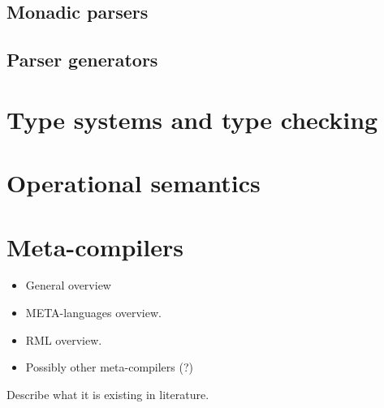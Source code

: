 \subsection{Monadic parsers}

\subsection{Parser generators}

\section{Type systems and type checking}
\label{sec:ch_background_type_checking}

\section{Operational semantics}
\label{sec:ch_background_semantics}

\section{Meta-compilers}

\begin{itemize}[noitemsep]
	\item General overview
	\item META-languages overview.
	\item RML overview.
	\item Possibly other meta-compilers (?)
\end{itemize}

Describe what it is existing in literature.



